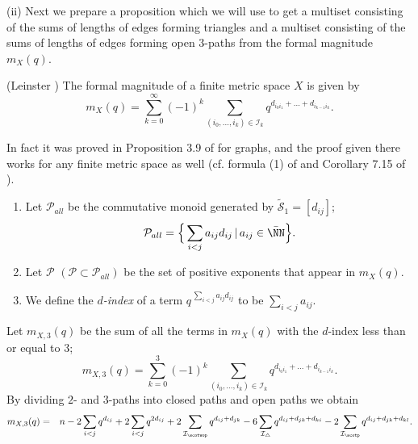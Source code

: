 \medskip
(ii) Next we prepare a proposition which we will use to get a multiset consisting of the sums of lengths of edges forming triangles and a multiset consisting of the sums of lengths of edges forming open $3$-paths from the formal magnitude $m_X(q)$. 



\begin{proposition}\label{Leinster}{\rm (Leinster \cite{L19})} 
The formal magnitude of a finite metric space $X$ is given by 
\begin{equation}\label{eqL}
m_X(q)=\sum_{k=0}^\infty(-1)^k\sum_{(i_0,\dots,i_k)\in\mathcal{I}_k}q^{d_{i_0i_1}+\dots+d_{i_{k-1}i_k}}.
\end{equation}
\end{proposition}
%
In fact it was proved in Proposition 3.9 of \cite{L19} for graphs, and the proof given there works for any finite metric space as well (cf. formula (1) of \cite{HW} and Corollary 7.15 of \cite{LS}). 

%
\begin{definition}\label{def_d-index}  \rm 
\begin{enumerate}
\item 
Let $\mathcal{P}_{all}$ be the commutative monoid generated by $\widetilde{\mathcal{S}}_1=[d_{ij}]$;
\begin{equation}\label{P_all}
\mathcal{P}_{all}=\Big\{\sum_{i<j}a_{ij}d_{ij}\,|\,a_{ij}\in\bar\NN%
\Big\}.
%
\end{equation}
%
\item Let $\mathcal{P}$ $(\mathcal{P}\subset\mathcal{P}_{all})$ be the set of positive exponents that appear in $m_X(q)$. 
%
%
\item 
We define the {\em $d$-index} of a term $q^{\,\sum_{i<j}a_{ij}d_{ij}}$ to be $\sum_{i<j}a_{ij}$. 
%
\end{enumerate}
\end{definition}
%

%
Let $m_{X,3}(q)$ be the sum of all the terms in $m_X(q)$ with the $d$-index less than or equal to $3$; 
\[
m_{X,3}(q)=\sum_{k=0}^3(-1)^k\sum_{(i_0,\dots,i_k)\in\mathcal{I}_k}q^{d_{i_0i_1}+\dots+d_{i_{k-1}i_k}}.
\]
%
By dividing $2$- and $3$-paths into closed paths and open paths we obtain 
%
\begin{eqnarray}
m_{X,3}(q)&=&\displaystyle n-2\sum_{i<j}q^{d_{ij}}+2\sum_{i<j}q^{2d_{ij}}
+2\sum_{\mathcal{I}_\scotwop} q^{d_{ij}+d_{jk}}
%
%
%
%
-6\sum_{\mathcal{I}_\triangle} q^{d_{ij}+d_{jk}+d_{ki}} 
%
-2\sum_{\mathcal{I}_\scotp} q^{d_{ij}+d_{jk}+d_{kl}}.
%
%
%
%
%
\label{m_3}
\end{eqnarray}
%
%



